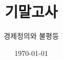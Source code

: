 \documentclass{article}
\begin{document}

\title{기말고사} %
\author{경제정의와 불평등} %
\date{\today}

\maketitle

%
\end{document}
